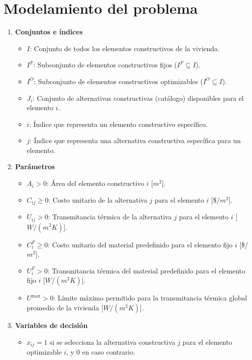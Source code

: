 \section{Modelamiento del problema}
\begin{enumerate}

    \vspace{1em}
    \item \textbf{Conjuntos e índices}
    \begin{itemize}
        \item $I$: Conjunto de todos los elementos constructivos de la vivienda.
        \item $I^{F}$: Subconjunto de elementos constructivos fijos ($I^{F} \subseteq I$).
        \item $I^{O}$: Subconjunto de elementos constructivos optimizables ($I^{O} \subseteq I$).
        \item $J_{i}$: Conjunto de alternativas constructivas (catálogo) disponibles para el elemento $i$.
        \item $i$: Índice que representa un elemento constructivo específico.
        \item $j$: Índice que representa una alternativa constructiva específica para un elemento.
    \end{itemize}

    \vspace{1em}
    \item \textbf{Parámetros}
    \begin{itemize}
        \item $A_{i} > 0$: Área del elemento constructivo $i$ [$m^{2}$].
        \item $C_{ij} \geq 0$: Costo unitario de la alternativa $j$ para el elemento $i$ [\$/$m^{2}$]. 
        \item $U_{ij} > 0$: Transmitancia térmica de la alternativa $j$ para el elemento $i$ [$W/(m^{2}K)$].
        \item $C_{i}^{F} \geq 0$: Costo unitario del material predefinido para el elemento fijo $i$ [\$/$m^{2}$]. 
        \item $U_{i}^{F} > 0$: Transmitancia térmica del material predefinido para el elemento fijo $i$ [$W/(m^{2}K)$].
        \item $U^{\text{max}} > 0$: Límite máximo permitido para la transmitancia térmica global promedio de la vivienda [$W/(m^{2}K)$].
    \end{itemize}

    \vspace{1em}
    \item \textbf{Variables de decisión}
    \begin{itemize}
        \item $x_{ij} = 1$ si se selecciona la alternativa constructiva $j$ para el elemento optimizable $i$, y $0$ en caso contrario.
    \end{itemize}


\end{enumerate}
